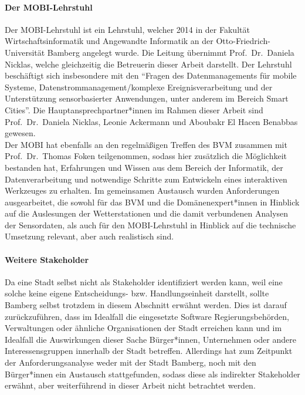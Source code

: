 \paragraph{Der \ac{MOBI}-Lehrstuhl}
Der \ac{MOBI}-Lehrstuhl ist ein Lehrstuhl, welcher 2014 in der Fakultät Wirtschaftsinformatik und Angewandte Informatik an der Otto-Friedrich-Universität Bamberg angelegt wurde. Die Leitung übernimmt Prof.\ Dr.\ Daniela Nicklas, welche gleichzeitig die Betreuerin dieser Arbeit darstellt. Der Lehrstuhl beschäftigt sich insbesondere mit den \enquote{Fragen des Datenmanagements für mobile Systeme, Datenstrommanagement/komplexe Ereignisverarbeitung und der Unterstützung sensorbasierter Anwendungen, unter anderem im Bereich Smart Cities}. Die Hauptansprechpartner*innen im Rahmen dieser Arbeit sind Prof.\ Dr.\ Daniela Nicklas, Leonie Ackermann und Aboubakr El Hacen Benabbas gewesen. \\ Der MOBI hat ebenfalls an den regelmäßigen Treffen des \ac{BVM} zusammen mit Prof.\ Dr.\ Thomas Foken teilgenommen, sodass hier zusätzlich die Möglichkeit bestanden hat, Erfahrungen und Wissen aus dem Bereich der Informatik, der Datenverarbeitung und notwendige Schritte zum Entwickeln eines interaktiven Werkzeuges zu erhalten. Im gemeinsamen Austausch wurden Anforderungen ausgearbeitet, die sowohl für das \ac{BVM} und die Domänenexpert*innen in Hinblick auf die Auslesungen der Wetterstationen und die damit verbundenen Analysen der Sensordaten, als auch für den \ac{MOBI}-Lehrstuhl in Hinblick auf die technische Umsetzung relevant, aber auch realistisch sind.

\paragraph{Weitere Stakeholder}
Da eine Stadt selbst nicht als Stakeholder identifiziert werden kann, weil eine solche keine eigene Entscheidungs- bzw. Handlungseinheit darstellt, sollte Bamberg selbst trotzdem in diesem Abschnitt erwähnt werden. Dies ist darauf zurückzuführen, dass im Idealfall die eingesetzte Software Regierungsbehörden, Verwaltungen oder ähnliche Organisationen der Stadt erreichen kann und im Idealfall die Auswirkungen dieser Sache Bürger*innen, Unternehmen oder andere Interessensgruppen innerhalb der Stadt betreffen. Allerdings hat zum Zeitpunkt der Anforderungsanalyse weder mit der Stadt Bamberg, noch mit den Bürger*innen ein Austausch stattgefunden, sodass diese als indirekter Stakeholder erwähnt, aber weiterführend in dieser Arbeit nicht betrachtet werden.

